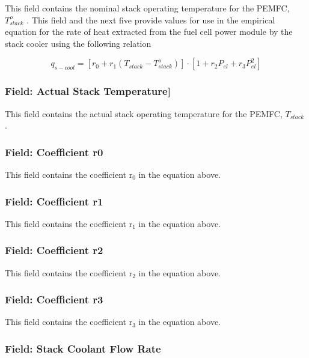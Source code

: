 This field contains the nominal stack operating temperature for the PEMFC, \(T_{stack}^o\) . This field and the next five provide values for use in the empirical equation for the rate of heat extracted from the fuel cell power module by the stack cooler using the following relation

\begin{equation}
{q_{s - cool}} = \left[ {{r_0} + {r_1}\left( {{T_{stack}} - T_{stack}^o} \right)} \right] \cdot \left[ {1 + {r_2}{P_{el}} + {r_3}P_{el}^2} \right]
\end{equation}

\subsubsection{Field: Actual Stack Temperature{]}}\label{field-actual-stack-temperature}

This field contains the actual stack operating temperature for the PEMFC, \({T_{stack}}\) .

\subsubsection{Field: Coefficient r0}\label{field-coefficient-r0}

This field contains the coefficient r\(_{0}\) in the equation above.

\subsubsection{Field: Coefficient r1}\label{field-coefficient-r1}

This field contains the coefficient r\(_{1}\) in the equation above.

\subsubsection{Field: Coefficient r2}\label{field-coefficient-r2}

This field contains the coefficient r\(_{2}\) in the equation above.

\subsubsection{Field: Coefficient r3}\label{field-coefficient-r3}

This field contains the coefficient r\(_{3}\) in the equation above.

\subsubsection{Field: Stack Coolant Flow Rate}\label{field-stack-coolant-flow-rate}

